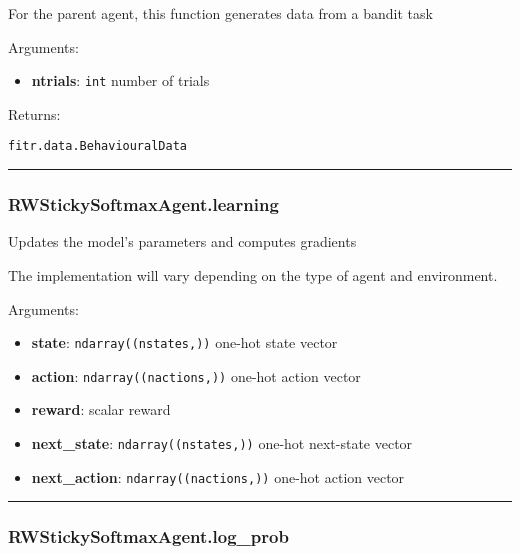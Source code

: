 For the parent agent, this function generates data from a bandit task

Arguments:

\begin{itemize}
\tightlist
\item
  \textbf{ntrials}: \texttt{int} number of trials
\end{itemize}

Returns:

\texttt{fitr.data.BehaviouralData}

\begin{center}\rule{0.5\linewidth}{\linethickness}\end{center}

\subsubsection{RWStickySoftmaxAgent.learning}\label{rwstickysoftmaxagent.learning}

\begin{Shaded}
\begin{Highlighting}[]
\end{Highlighting}
\end{Shaded}

Updates the model's parameters and computes gradients

The implementation will vary depending on the type of agent and
environment.

Arguments:

\begin{itemize}
\tightlist
\item
  \textbf{state}: \texttt{ndarray((nstates,))} one-hot state vector
\item
  \textbf{action}: \texttt{ndarray((nactions,))} one-hot action vector
\item
  \textbf{reward}: scalar reward
\item
  \textbf{next\_state}: \texttt{ndarray((nstates,))} one-hot next-state
  vector
\item
  \textbf{next\_action}: \texttt{ndarray((nactions,))} one-hot action
  vector
\end{itemize}

\begin{center}\rule{0.5\linewidth}{\linethickness}\end{center}

\subsubsection{RWStickySoftmaxAgent.log\_prob}\label{rwstickysoftmaxagent.log_prob}

